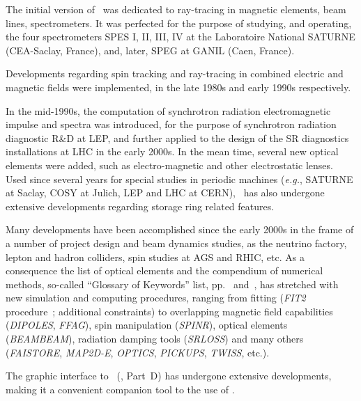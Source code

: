 \noindent The initial  version of \zgoubi\ was dedicated to  ray-tracing in magnetic elements, beam lines, spectrometers. 
 It was perfected for the purpose of studying, and operating, the four spectrometers SPES I, II, III, IV  
at the  Laboratoire National SATURNE (CEA-Saclay, France), and, later,  SPEG at GANIL 
(Caen, France). 

\medskip

\noindent Developments regarding  spin tracking and ray-tracing in combined electric and magnetic fields
were implemented, in the late 1980s and early 1990s respectively.  

\medskip

\noindent In the mid-1990s,  the computation of 
synchrotron radiation electromagnetic impulse and spectra was introduced, 
for the purpose of synchrotron radiation diagnostic R\&D at LEP, and further applied to the 
design of the SR diagnostics installations at LHC in the early 2000s. 
In the mean time, several new optical elements were added, such as 
electro-magnetic and other electrostatic lenses. Used since several years for special studies in periodic
machines (\emph{e.g.}, SATURNE at Saclay, COSY at Julich, LEP and LHC at CERN),  
\zgou\  has also undergone extensive developments regarding storage ring related features.

\medskip

\noindent Many developments have been accomplished since the early 2000s in the frame of a number of 
project design and beam dynamics studies, as the neutrino factory, lepton and hadron colliders, 
spin studies at AGS and RHIC, etc. 
As a consequence the list of optical elements and the compendium of numerical methods, 
so-called ``Glossary of Keywords'' list, pp.~\pageref{GOK1A} and~\pageref{GOK1B},
  has stretched with new 
simulation and computing procedures, ranging from fitting (\textsl{FIT2} procedure~;  
additional constraints) to overlapping magnetic field  capabilities (\textsl{DIPOLES}, \textsl{FFAG}), 
spin manipulation (\textsl{SPINR}), optical elements (\textsl{BEAMBEAM}),  radiation damping tools (\textsl{SRLOSS}) 
and many others (\textsl{FAISTORE}, \textsl{MAP2D-E}, \textsl{OPTICS}, \textsl{PICKUPS}, \textsl{TWISS}, etc.). 

\medskip

\noindent The graphic  interface to \zgou\ (\zpop, Part~D) has undergone  extensive  developments, making it 
a convenient companion tool to the use of \zgoubi. 




